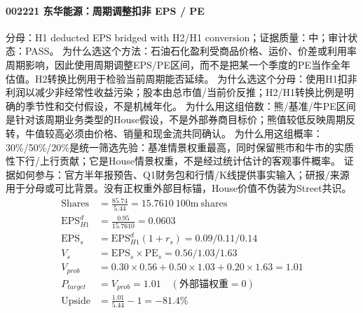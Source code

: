 \paragraph{002221 东华能源：周期调整扣非 EPS / PE}
分母：H1 deducted EPS bridged with H2/H1 conversion；证据质量：中；审计状态：PASS。
为什么选这个方法：石油石化盈利受商品价格、运价、价差或利用率周期影响，因此使用周期调整EPS/PE区间，而不是把某一个季度的PE当作全年估值。H2转换比例用于检验当前周期能否延续。
为什么选这个分母：使用H1扣非利润以减少非经常性收益污染；股本由总市值/当前价反推；H2/H1转换比例是明确的季节性和交付假设，不是机械年化。
为什么用这组倍数：熊/基准/牛PE区间是针对该周期业务类型的House假设，不是外部券商目标价；熊值较低反映周期反转，牛值较高必须由价格、销量和现金流共同确认。
为什么用这组概率：30\%/50\%/20\%是统一筛选先验：基准情景权重最高，同时保留熊市和牛市的实质性下行/上行贡献；它是House情景权重，不是经过统计估计的客观事件概率。
证据如何参与：官方半年报预告、Q1财务包和行情/K线提供事实输入；研报/来源用于分母或可比背景。没有正权重外部目标锚，House价值不伪装为Street共识。
\begin{align*}
\mathrm{Shares} &= \frac{85.74}{5.44}=15.7610\ \mathrm{100m\ shares}\\
\mathrm{EPS}_{H1}^d &= \frac{0.95}{15.7610}=0.0603\\
\mathrm{EPS}_s &= \mathrm{EPS}_{H1}^d(1+r_s)=0.09/0.11/0.14\\
V_s &= \mathrm{EPS}_s\times \mathrm{PE}_s=0.56/1.03/1.63\\
V_{prob} &= 0.30\times 0.56+0.50\times 1.03+0.20\times 1.63=1.01\\
P_{target} &= V_{prob}=1.01\quad(\text{外部锚权重}=0)\\
\mathrm{Upside} &= \frac{1.01}{5.44}-1=-81.4\%\\
\end{align*}

